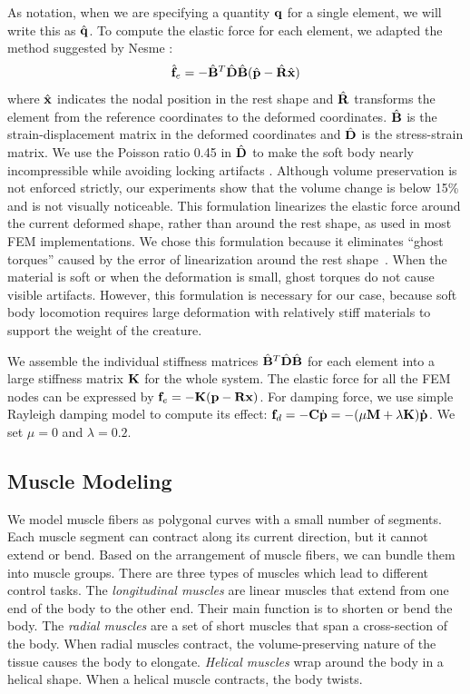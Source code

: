 As notation, when we are specifying a quantity $\mathbf{q}$
for a single element, we will write this as $\hat{\mathbf{q}}$.
To compute the elastic force for each element, we adapted the method
suggested by Nesme \etal \cite{NPF05}:
\begin{equation}
\hat{\mathbf{f}}_e=-\hat{\mathbf{B}}^T\hat{\mathbf{D}}\hat{\mathbf{B}}(\hat{\mathbf{p}}-\hat{\mathbf{R}}\hat{\mathbf{x}})
\end{equation}
where $\hat{\mathbf{x}}$ indicates the nodal position in the rest shape
and $\hat{\mathbf{R}}$ transforms the element from the reference
coordinates to the deformed coordinates. $\hat{\mathbf{B}}$ is the
strain-displacement matrix in the deformed coordinates
and $\hat{\mathbf{D}}$ is the stress-strain matrix. We use the Poisson ratio 0.45 in $\hat{\mathbf{D}}$ to make the soft body
nearly incompressible while avoiding locking artifacts \cite{Irving:2007}. Although volume preservation is not enforced strictly, our experiments show that the volume change is below 15\% and is not visually noticeable.
This formulation linearizes the
elastic force around the current deformed shape, rather than around
the rest shape, as used in most FEM implementations. We chose this
formulation because it eliminates ``ghost torques'' caused by the
error of linearization around the rest shape~\cite{NPF05}. When the material is soft or when the deformation is
small, ghost torques do not cause visible artifacts. However, this
formulation is necessary for our case, because soft body locomotion
requires large deformation with relatively stiff materials to support
the weight of the creature.

We assemble the individual stiffness matrices $\hat{\mathbf{B}}^T\hat{\mathbf{D}}\hat{\mathbf{B}}$ for
each element into a large stiffness matrix $\mathbf{K}$ for the whole
system. The elastic force for all the FEM nodes can be expressed by
$\mathbf{f}_e=-\mathbf{K}(\mathbf{p}-\mathbf{R}\mathbf{x})$. For damping force, we use
simple Rayleigh damping model to compute its effect:
$\mathbf{f}_d=-\mathbf{C}\dot{\mathbf{p}}=-(\mu\mathbf{M}+\lambda\mathbf{K})\mathbf{\dot{p}}$. We
set $\mu = 0$ and $\lambda = 0.2$.

\subsection{Muscle Modeling}
We model muscle fibers as polygonal curves with a small number of
segments. Each muscle segment can contract along its current direction, but
it cannot extend or bend. Based on the arrangement of muscle fibers,
we can bundle them into muscle groups. There are three types of
muscles which lead to different control tasks. The \emph{longitudinal
muscles} are linear muscles that extend from one end of the body to the
other end. Their main function is to shorten or bend the body. The
\emph{radial muscles} are a set of short muscles that span a cross-section
of the body. When radial muscles contract, the volume-preserving
nature of the tissue causes the body to elongate. \emph{Helical
muscles} wrap around the body in a helical shape. When a helical muscle
contracts, the body twists.

